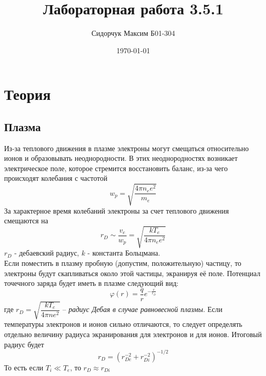 \documentclass{lab}
\title {Лабораторная работа 3.5.1}
\author {Сидорчук Максим Б01-304}
\date{\today}
\begin{document}
\maketitle
\section*{Теория}
\subsection*{Плазма}

Из-за теплового движения в плазме электроны могут смещаться относительно ионов и образовывать неоднородности. В этих неоднородностях возникает электрическое поле, которое стремится восстановить баланс, из-за чего происходят колебания с частотой
\[w_p = \sqrt{\frac{4\pi n_e e^2}{m_e}}\]
За характерное время колебаний электроны за счет теплового движения смещаются на
\[r_D \sim \frac{v_e}{w_p} = \sqrt{\frac{kT_e}{4\pi n_e e^2}}\]
$r_D$ - дебаевский радиус, $k$ - константа Больцмана.\\
Если поместить в плазму пробную (допустим, положительную) частицу, то электроны будут скапливаться около этой частицы, экранируя её поле. Потенциал точечного заряда будет иметь в плазме следующий вид:
\[\varphi(r) = \frac{q}{r}e^{-\frac{r}{r_D}}\]
где $r_D = \sqrt{\dfrac{kT_e}{4\pi n e^2}}$ -- \textit{радиус Дебая в случае равновесной плазмы}. Если температуры электронов и ионов сильно отличаются, то следует определять отдельно величину радиуса экранирования для электронов и для ионов. Итоговый радиус будет
\[r_D = (r_{De}^{-2} + r_{Di}^{-2})^{-1/2}\]
То есть если $T_i \ll T_e$, то $r_D \approx r_{Di}$
\end{document}
